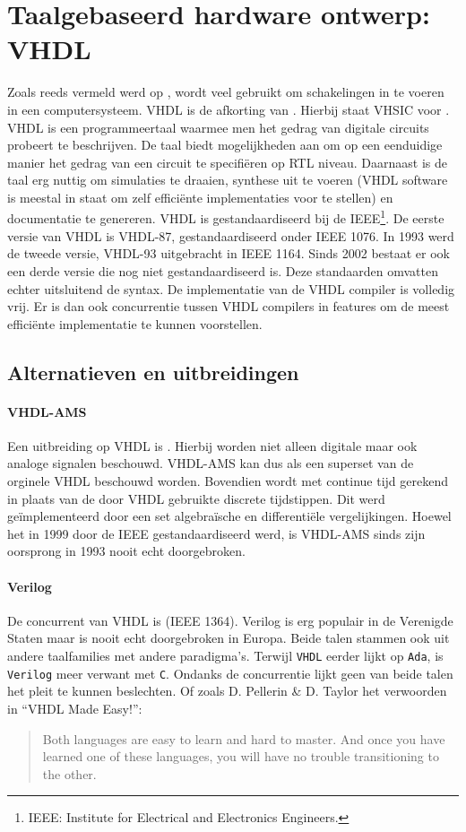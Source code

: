 \section{Taalgebaseerd hardware ontwerp: VHDL}
Zoals reeds vermeld werd op , wordt  veel gebruikt om schakelingen in te voeren in een computersysteem. VHDL is de afkorting van . Hierbij staat VHSIC voor . VHDL is een programmeertaal waarmee men het gedrag van digitale circuits probeert te beschrijven. De taal biedt mogelijkheden aan om op een eenduidige manier het gedrag van een circuit te specifi\"eren op RTL niveau. Daarnaast is de taal erg nuttig om simulaties te draaien, synthese uit te voeren (VHDL software is meestal in staat om zelf effici\"ente implementaties voor te stellen) en documentatie te genereren. VHDL is gestandaardiseerd bij de IEEE\footnote{IEEE: Institute for Electrical and Electronics Engineers.}. De eerste versie van VHDL is VHDL-87, gestandaardiseerd onder IEEE 1076. In 1993 werd de tweede versie, VHDL-93 uitgebracht in IEEE 1164. Sinds 2002 bestaat er ook een derde versie die nog niet gestandaardiseerd is. Deze standaarden omvatten echter uitsluitend de syntax. De implementatie van de VHDL compiler is volledig vrij. Er is dan ook concurrentie tussen VHDL compilers in features om de meest effici\"ente implementatie te kunnen voorstellen.
\subsection{Alternatieven en uitbreidingen}
\paragraph{VHDL-AMS}Een uitbreiding op VHDL is . Hierbij worden niet alleen digitale maar ook analoge signalen beschouwd. VHDL-AMS kan dus als een superset van de orginele VHDL beschouwd worden. Bovendien wordt met continue tijd gerekend in plaats van de door VHDL gebruikte discrete tijdstippen. Dit werd ge\"implementeerd door een set algebra\"ische en differenti\"ele vergelijkingen. Hoewel het in 1999 door de IEEE gestandaardiseerd werd, is VHDL-AMS sinds zijn oorsprong in 1993 nooit echt doorgebroken.
\paragraph{Verilog}De concurrent van VHDL is  (IEEE 1364). Verilog is erg populair in de Verenigde Staten maar is nooit echt doorgebroken in Europa. Beide talen stammen ook uit andere taalfamilies met andere paradigma's. Terwijl \verb+VHDL+ eerder lijkt op \verb+Ada+, is \verb+Verilog+ meer verwant met \verb+C+. Ondanks de concurrentie lijkt geen van beide talen het pleit te kunnen beslechten. Of zoals D. Pellerin \& D. Taylor het verwoorden in ``VHDL Made Easy!''\cite{pellerin1997vhdl}:
\begin{quote}
Both languages are easy to learn and hard to master. And once you have learned one of these languages, you will have no trouble transitioning to the other.
\end{quote}
